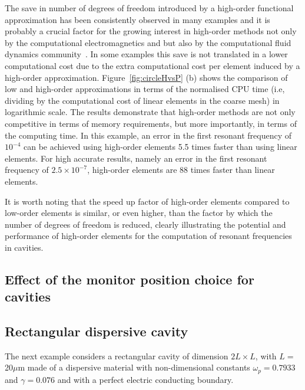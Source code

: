 The save in number of degrees of freedom introduced by a high-order functional approximation has been consistently observed in many examples and it is probably a crucial factor for the growing interest in high-order methods not only by the computational electromagnetics and but also by the computational fluid dynamics community~\cite{ADIGMA,HO-Fluids}. In some examples this save is not translated in a lower computational cost due to the extra computational cost per element induced by a high-order approximation. Figure~\ref{fig:circleHvsP} (b) shows the comparison of low and high-order approximations in terms of the normalised CPU time (i.e, dividing by the computational cost of linear elements in the coarse mesh) in logarithmic scale. The results demonstrate that high-order methods are not only competitive in terms of memory requirements, but more importantly, in terms of the computing time. In this example, an error in the first resonant frequency of $10^{-4}$ can be achieved using high-order elements 5.5 times faster than using linear elements. For high accurate results, namely an error in the first resonant frequency of $2.5 \times 10^{-7}$, high-order elements are 88 times faster than linear elements.

It is worth noting that the speed up factor of high-order elements compared to low-order elements is similar, or even higher, than the factor by which the number of degrees of freedom is reduced, clearly illustrating the potential and performance of high-order elements for the computation of resonant frequencies in cavities.


\clearpage
\subsection{Effect of the monitor position choice for cavities}
\clearpage
\subsection{Rectangular dispersive cavity}
The next example considers a rectangular cavity of dimension $2L \times L$, with $L=$20$\mu$m made of a dispersive material with non-dimensional constants $\omega_p = 0.7933$ and $\gamma = 0.076$ and with a perfect electric conducting boundary.

